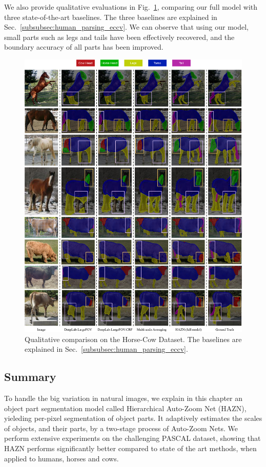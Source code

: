 We also provide qualitative evaluations in Fig.~\ref{fig:horse_cow_res_eccv}, comparing our full model with three state-of-the-art baselines. The three baselines are explained in Sec.~\ref{subsubsec:human_parsing_eccv}. We can observe that using our model, small parts such as legs and tails have been effectively recovered, and the boundary accuracy of all parts has been improved. 

\begin{figure}
\centering
\includegraphics[width=0.95\linewidth]{figs/horse_cow_visual_results_eccv.pdf}
\caption{Qualitative comparison on the Horse-Cow Dataset. The baselines are explained in Sec.~\ref{subsubsec:human_parsing_eccv}.}
\label{fig:horse_cow_res_eccv}
\end{figure}

\subsection{Summary}
To handle the big variation in natural images, we explain in this chapter an object part segmentation model called Hierarchical Auto-Zoom Net (HAZN), yieleding per-pixel segmentation of object parts. It adaptively estimates the scales of objects, and their parts, by a two-stage process of Auto-Zoom Nets. We perform extensive experiments on the challenging PASCAL dataset, showing that HAZN performs significantly better compared to state of the art methods, when applied to humans, horses and cows.

